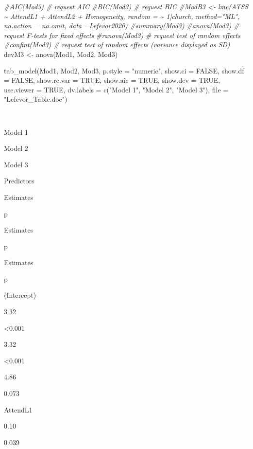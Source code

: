 \documentclass[
  11pt,
]{book}
\newenvironment{Shaded}{\begin{snugshade}}{\end{snugshade}}
\newcommand{\AttributeTok}[1]{\textcolor[rgb]{0.77,0.63,0.00}{#1}}
\newcommand{\CommentTok}[1]{\textcolor[rgb]{0.56,0.35,0.01}{\textit{#1}}}
\newcommand{\ConstantTok}[1]{\textcolor[rgb]{0.00,0.00,0.00}{#1}}
\newcommand{\FunctionTok}[1]{\textcolor[rgb]{0.00,0.00,0.00}{#1}}
\newcommand{\NormalTok}[1]{#1}
\newcommand{\OtherTok}[1]{\textcolor[rgb]{0.56,0.35,0.01}{#1}}
\newcommand{\StringTok}[1]{\textcolor[rgb]{0.31,0.60,0.02}{#1}}
\begin{document}
\begin{Shaded}
\begin{Highlighting}[]
\CommentTok{\#AIC(Mod3) \# request AIC}
\CommentTok{\#BIC(Mod3) \# request BIC}
\CommentTok{\#ModB3 \textless{}{-} lme(ATSS \textasciitilde{}  AttendL1 +  AttendL2 + Homogeneity, random = \textasciitilde{} 1|church, method="ML", na.action = na.omit, data =Lefevor2020)}
\CommentTok{\#summary(Mod3)}
\CommentTok{\#anova(Mod3) \# request F{-}tests for fixed effects}
\CommentTok{\#ranova(Mod3) \# request test of random effects}
\CommentTok{\#confint(Mod3) \# request test of random effects (variance displayed as SD)}
\NormalTok{devM3 }\OtherTok{\textless{}{-}} \FunctionTok{anova}\NormalTok{(Mod1, Mod2, Mod3) }

\FunctionTok{tab\_model}\NormalTok{(Mod1, Mod2, Mod3, }\AttributeTok{p.style =} \StringTok{"numeric"}\NormalTok{, }\AttributeTok{show.ci =} \ConstantTok{FALSE}\NormalTok{, }\AttributeTok{show.df =} \ConstantTok{FALSE}\NormalTok{, }\AttributeTok{show.re.var =} \ConstantTok{TRUE}\NormalTok{, }\AttributeTok{show.aic =} \ConstantTok{TRUE}\NormalTok{, }\AttributeTok{show.dev =} \ConstantTok{TRUE}\NormalTok{, }\AttributeTok{use.viewer =} \ConstantTok{TRUE}\NormalTok{, }\AttributeTok{dv.labels =} \FunctionTok{c}\NormalTok{(}\StringTok{"Model 1"}\NormalTok{, }\StringTok{"Model 2"}\NormalTok{, }\StringTok{"Model 3"}\NormalTok{), }\AttributeTok{file =} \StringTok{"Lefevor\_Table.doc"}\NormalTok{)}
\end{Highlighting}
\end{Shaded}

~

Model 1

Model 2

Model 3

Predictors

Estimates

p

Estimates

p

Estimates

p

(Intercept)

3.32

\textless0.001

3.32

\textless0.001

4.86

0.073

AttendL1

0.10

0.039
\end{document}
